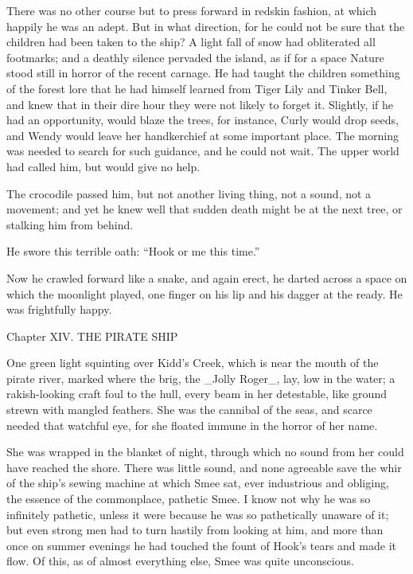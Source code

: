There was no other course but to press forward in redskin fashion, at
which happily he was an adept. But in what direction, for he could not
be sure that the children had been taken to the ship? A light fall of
snow had obliterated all footmarks; and a deathly silence pervaded the
island, as if for a space Nature stood still in horror of the recent
carnage. He had taught the children something of the forest lore that
he had himself learned from Tiger Lily and Tinker Bell, and knew that
in their dire hour they were not likely to forget it. Slightly, if he
had an opportunity, would blaze the trees, for instance, Curly would
drop seeds, and Wendy would leave her handkerchief at some important
place. The morning was needed to search for such guidance, and he could
not wait. The upper world had called him, but would give no help.

The crocodile passed him, but not another living thing, not a sound,
not a movement; and yet he knew well that sudden death might be at the
next tree, or stalking him from behind.

He swore this terrible oath: ``Hook or me this time.''

Now he crawled forward like a snake, and again erect, he darted across
a space on which the moonlight played, one finger on his lip and his
dagger at the ready. He was frightfully happy.




Chapter XIV.
THE PIRATE SHIP


One green light squinting over Kidd's Creek, which is near the mouth of
the pirate river, marked where the brig, the _Jolly Roger_, lay, low in
the water; a rakish-looking craft foul to the hull, every beam in her
detestable, like ground strewn with mangled feathers. She was the
cannibal of the seas, and scarce needed that watchful eye, for she
floated immune in the horror of her name.

She was wrapped in the blanket of night, through which no sound from
her could have reached the shore. There was little sound, and none
agreeable save the whir of the ship's sewing machine at which Smee sat,
ever industrious and obliging, the essence of the commonplace, pathetic
Smee. I know not why he was so infinitely pathetic, unless it were
because he was so pathetically unaware of it; but even strong men had
to turn hastily from looking at him, and more than once on summer
evenings he had touched the fount of Hook's tears and made it flow. Of
this, as of almost everything else, Smee was quite unconscious.

